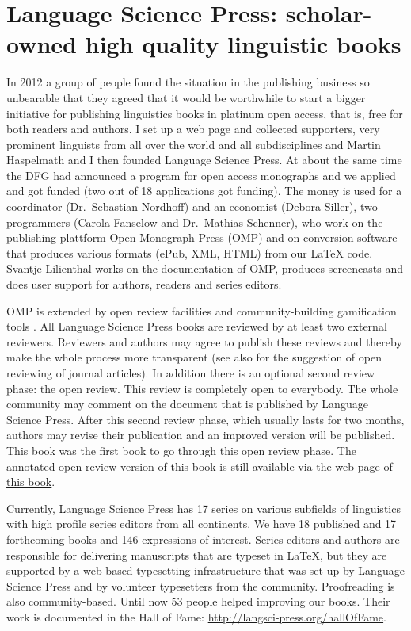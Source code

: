 \section*{Language Science Press: scholar-owned high quality linguistic books}

In 2012 a group of people found the situation in the publishing business so unbearable that they
agreed that it would be worthwhile to start a bigger initiative for publishing linguistics books in
platinum open access, that is, free for both readers and authors. I set up a web page and collected
supporters, very prominent linguists from all over the world and all subdisciplines and Martin
Haspelmath and I then founded Language Science Press. At about the same time the DFG had announced
a program for open access monographs and we applied \citep{MH2013a} and got funded (two out of 18 applications got
funding). The money is used for a coordinator (Dr.\ Sebastian Nordhoff) and an economist (Debora
Siller), two programmers (Carola Fanselow and Dr.\ Mathias Schenner), who work on the publishing
plattform Open Monograph Press (OMP) and on conversion software that produces various formats (ePub, XML,
HTML) from our \LaTeX{} code. Svantje Lilienthal works on the documentation of OMP, produces
screencasts and does user support for authors, readers and series editors.

OMP is extended by open review facilities and community-building gamification tools
\citep{MuellerOA,MH2013a}. All Language Science Press books are reviewed by at least two external
reviewers. Reviewers and authors may agree to publish these reviews and thereby make the whole
process more transparent (see also  for the suggestion of open reviewing of journal
articles). In addition there is an optional second review phase: the open
review. This review is completely open to everybody. The whole community may comment on the document
that is published by Language Science Press. After this second review phase, which usually lasts for
two months, authors may revise their publication and an improved version will be published. This
book was the first book to go through this open review phase. The annotated open review version of this book is still available via
the \href{\lsURL}{web page of this book}. 

\largerpage
Currently, Language Science Press has 17 series on various subfields of linguistics with high
profile series editors from all continents. We have 18 published and 17 forthcoming books and 146
expressions of interest. Series editors  and authors are responsible for
delivering manuscripts that are typeset in \LaTeX{}, but they are supported by a web-based typesetting
infrastructure that was set up by Language Science Press and by volunteer typesetters from the
community. Proofreading is also community-based. Until now 53 people helped improving our
books. Their work is documented in the Hall of Fame: \url{http://langsci-press.org/hallOfFame}.

